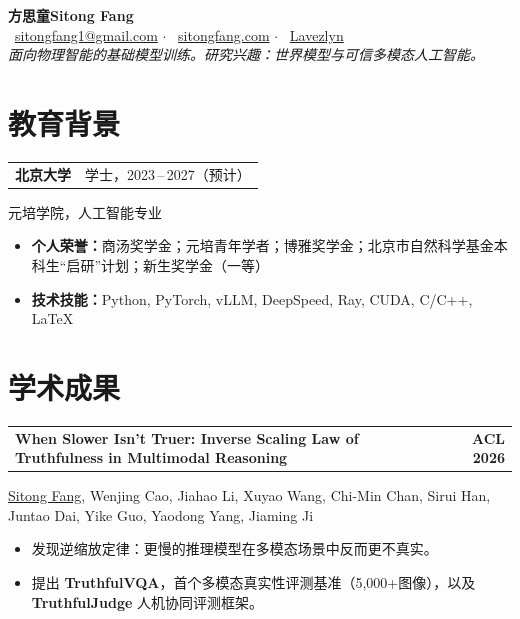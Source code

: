 \documentclass[11pt,a4paper]{article}
\makeatletter
\newcommand{\me}{\uline{Sitong Fang}}
\newcommand{\pubentry}[3]{%
  \Needspace{5\baselineskip}%
  \noindent\begin{tabularx}{\textwidth}{@{}>{\raggedright\arraybackslash}X r@{}}
    \textbf{#1} & #2\enspace\href{#3}{\faFilePdf} \\
  \end{tabularx}\vspace{-2pt}%
}
\newcommand{\cventry}[2]{%
  \Needspace{4\baselineskip}%
  \noindent\begin{tabularx}{\textwidth}{@{}X r@{}}
    \textbf{#1} & {#2} \\
  \end{tabularx}\vspace{-2pt}%
}
\newcommand{\venue}[1]{%
  \colorbox{gray!15}{\small\textbf{#1}}%
}
\makeatother
\begin{document}
\begin{center}
  {\LARGE\bfseries 方思童\enspace Sitong Fang} \\[5pt]
  \faEnvelope~\href{mailto:sitongfang1@gmail.com}{sitongfang1@gmail.com}
  \quad$\cdot$\quad
  \faGlobe~\href{https://sitongfang.com}{sitongfang.com}
  \quad$\cdot$\quad
  \faGithub~\href{https://github.com/Lavezlyn}{Lavezlyn}
  \\[4pt]
  \textit{面向物理智能的基础模型训练。研究兴趣：世界模型与可信多模态人工智能。}
\end{center}

\vspace{-0.4em}

\section{教育背景}

\cventry{北京大学}{学士，2023\,--\,2027（预计）}
\noindent 元培学院，人工智能专业 \\[2pt]
\begin{itemize}
  \item \textbf{个人荣誉：}商汤奖学金；元培青年学者；博雅奖学金；北京市自然科学基金本科生“启研”计划；新生奖学金（一等）
  \item \textbf{技术技能：}Python, PyTorch, vLLM, DeepSpeed, Ray, CUDA, C/C++, \LaTeX
\end{itemize}

\section{学术成果}

\pubentry{When Slower Isn't Truer: Inverse Scaling Law of Truthfulness in Multimodal Reasoning}{\venue{ACL 2026}}{https://arxiv.org/abs/2505.20214}
\me{}, Wenjing Cao, Jiahao Li, Xuyao Wang, Chi-Min Chan, Sirui Han, Juntao Dai, Yike Guo, Yaodong Yang, Jiaming Ji
\begin{itemize}
  \item 发现逆缩放定律：更慢的推理模型在多模态场景中反而更不真实。
  \item 提出 \textbf{TruthfulVQA}，首个多模态真实性评测基准（5,000+图像），以及 \textbf{TruthfulJudge} 人机协同评测框架。
\end{itemize}
\end{document}
